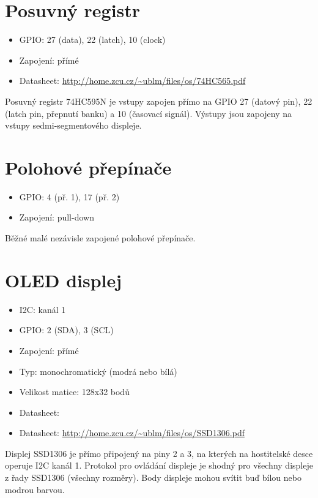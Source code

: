 \documentclass{article}
\begin{document}
\section{Posuvný registr}

\begin{itemize}
	\item GPIO: 27 (data), 22 (latch), 10 (clock)
	\item Zapojení: přímé
	\item Datasheet: \url{http://home.zcu.cz/~ublm/files/os/74HC565.pdf}
\end{itemize}

Posuvný registr 74HC595N je vstupy zapojen přímo na GPIO 27 (datový pin), 22 (latch pin, přepnutí banku) a 10 (časovací signál). Výstupy jsou zapojeny na vstupy sedmi-segmentového displeje.

\section{Polohové přepínače}

\begin{itemize}
	\item GPIO: 4 (př. 1), 17 (př. 2)
	\item Zapojení: pull-down
\end{itemize}

Běžné malé nezávisle zapojené polohové přepínače.

\section{OLED displej}

\begin{itemize}
	\item I2C: kanál 1
	\item GPIO: 2 (SDA), 3 (SCL)
	\item Zapojení: přímé
	\item Typ: monochromatický (modrá nebo bílá)
	\item Velikost matice: 128x32 bodů
	\item Datasheet: \item Datasheet: \url{http://home.zcu.cz/~ublm/files/os/SSD1306.pdf}
\end{itemize}

Displej SSD1306 je přímo připojený na piny 2 a 3, na kterých na hostitelské desce operuje I2C kanál 1. Protokol pro ovládání displeje je shodný pro všechny displeje z řady SSD1306 (všechny rozměry). Body displeje mohou svítit buď bílou nebo modrou barvou.
\end{document}
